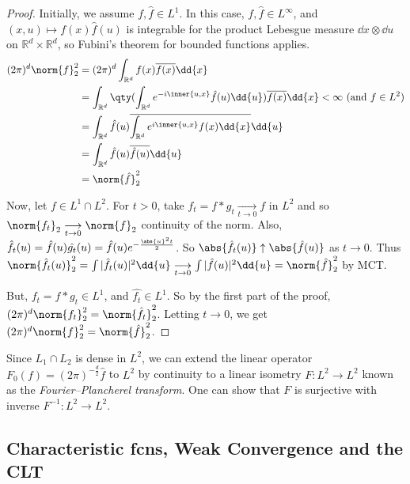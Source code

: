 \begin{proof}
	Initially, we assume $f, \hat f \in L^1$.
	In this case, $f, \hat f \in L^\infty$, and $(x,u) \mapsto f(x)\hat f(u)$ is integrable for the product Lebesgue measure $\dd{x} \otimes \dd{u}$ on $\mathbb R^d \times \mathbb R^d$, so Fubini's theorem for bounded functions applies.
	\begin{align*}
		(2\pi)^d \norm{f}_2^2 &= (2\pi)^d \int_{\mathbb R^d} f(x) \overline{f(x)} \dd{x} \\
		&= \int_{\mathbb R^d} \qty(\int_{\mathbb R^d} e^{-i\inner{u,x}} \hat f(u) \dd{u}) \overline{f(x)} \dd{x} < \infty \ (\text{and } f \in L^2) \\
		&= \int_{\mathbb R^d} \hat f(u) \overline{\int_{\mathbb R^d} e^{i\inner{u,x}} f(x) \dd{x}} \dd{u} \\
		&= \int_{\mathbb R^d} \hat f(u) \overline{\hat f(u)} \dd{u} \\
		&= \norm{\hat f}_2^2
	\end{align*}

	Now, let $f \in L^1 \cap L^2$.
	For $t > 0$, take $f_t = f \ast g_t \underset{t \to 0}{\longrightarrow} f$ in $L^2$ and so $\norm{f_t}_2 \underset{t \to 0}{\longrightarrow} \norm{f}_2$ continuity of the norm.
	Also, $\hat{f_t}(u) = \hat{f}(u) \hat{g_t}(u) = \hat f(u) e^{-\frac{\abs{u}^2 t}{2}}$.
	So $\abs{\hat{f_t}(u)} \uparrow \abs{\hat{f}(u)}$ as $t \to 0$.
	Thus $\norm{\hat{f_t}(u)}_2^2 = \int |\hat{f_t}(u)|^2 \dd{u} \underset{t \to 0}{\longrightarrow} \int |\hat{f}(u)|^2 \dd{u} = \norm{\hat{f}}_2^2$ by MCT.

	But, $f_t = f \ast g_t \in L^1$, and $\hat{f_t} \in L^1$.
	So by the first part of the proof, $(2\pi)^d \norm{f_t}_2^2 = \norm{\hat{f_t}}_2^2$.
	Letting $t \to 0$, we get $(2\pi)^d \norm{f}_2^2 = \norm{\hat{f}}_2^2$.
\end{proof}

\begin{remark}
	Since $L_1 \cap L_2$ is dense in $L^2$, we can extend the linear operator $F_0(f) = (2\pi)^{-\frac{d}{2}} \hat f$ to $L^2$ by continuity to a linear isometry $F \colon L^2 \to L^2$ known as the \emph{Fourier--Plancherel transform}.
	One can show that $F$ is surjective with inverse $F^{-1} \colon L^2 \to L^2$.
\end{remark}

\subsection{Characteristic fcns, Weak Convergence and the CLT}

